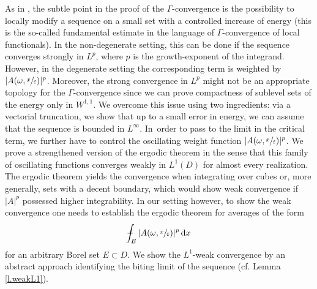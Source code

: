 \documentclass[11pt]{article}
\newcommand{\cf}{cf.\xspace}
\numberwithin{equation}{section}
\theoremstyle{definition}
\def\Xint#1{\mathchoice
{\XXint\displaystyle\textstyle{#1}}%
{\XXint\textstyle\scriptstyle{#1}}%
{\XXint\scriptstyle\scriptscriptstyle{#1}}%
{\XXint\scriptscriptstyle\scriptscriptstyle{#1}}%
\!\int}
\def\XXint#1#2#3{{\setbox0=\hbox{$#1{#2#3}{\int}$ }
\vcenter{\hbox{$#2#3$ }}\kern-.57\wd0}}
\def\dashint{\Xint-}
\let\e\varepsilon
\let\w\omega
\newcommand{\dx}{\,\mathrm{d}x}
\begin{document}
As in \cite{NSS}, the subtle point in the proof of the $\Gamma$-convergence is the possibility to locally modify a sequence on a small set with a controlled increase of energy (this is the so-called fundamental estimate in the language of $\Gamma$-convergence of local functionals). In the non-degenerate setting, this can be done if the sequence converges strongly in $L^p$, where $p$ is the growth-exponent of the integrand. However, in the degenerate setting the corresponding term is weighted by $|A(\w,\sfrac{x}{\e})|^p$. Moreover, the strong convergence in $L^p$ might not be an appropriate topology for the $\Gamma$-convergence since we can prove compactness of sublevel sets of the energy only in $W^{1,1}$. We overcome this issue using two ingredients: via a vectorial truncation, we show that up to a small error in energy, we can assume that the sequence is bounded in $L^{\infty}$. In~order to pass to the limit in the critical term, we further have to control the oscillating weight function $|A(\w,\sfrac{x}{\e})|^p$. We prove a strengthened version of the ergodic theorem in the sense that this family of oscillating functions converges weakly in $L^1(D)$ for almost every realization. The ergodic theorem yields the convergence when integrating over cubes or, more generally, sets with a decent boundary, which would show weak convergence if $|A|^p$ possessed higher integrability. In our setting however, to show the weak convergence one needs to establish the ergodic theorem for averages of the form
\begin{equation*}
\dashint_E |A(\w,\sfrac{x}{\e})|^p\dx
\end{equation*}
for an arbitrary Borel set $E\subset D$. We show the $L^1$-weak convergence by an abstract approach identifying the biting limit of the sequence (\cf Lemma \ref{l.weakL1}).
\end{document}
